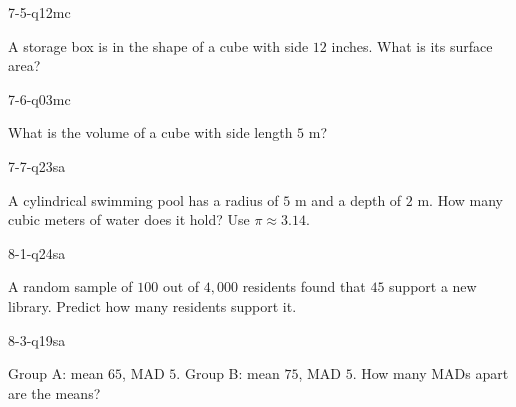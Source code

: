 \begin{practiceQuestion}{7-5-q12}{mc}
\begin{questionText}
A storage box is in the shape of a cube with side $12$ inches. What is its surface area?
\end{questionText}
\end{practiceQuestion}

\begin{practiceQuestion}{7-6-q03}{mc}
\begin{questionText}
What is the volume of a cube with side length $5$ m?
\end{questionText}
\end{practiceQuestion}

\begin{practiceQuestion}{7-7-q23}{sa}
\begin{questionText}
A cylindrical swimming pool has a radius of $5$ m and a depth of $2$ m. How many cubic meters of water does it hold? Use $\pi \approx 3.14$.
\end{questionText}
\end{practiceQuestion}

\begin{practiceQuestion}{8-1-q24}{sa}
\begin{questionText}
A random sample of $100$ out of $4{,}000$ residents found that $45$ support a new library. Predict how many residents support it.
\end{questionText}
\end{practiceQuestion}

\begin{practiceQuestion}{8-3-q19}{sa}
\begin{questionText}
Group A: mean $65$, MAD $5$. Group B: mean $75$, MAD $5$. How many MADs apart are the means?
\end{questionText}
\end{practiceQuestion}

